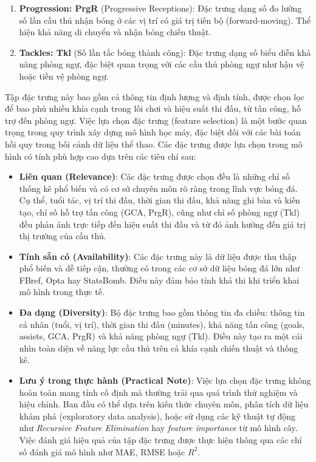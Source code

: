 \documentclass[12pt]{report}
\begin{document}
{\begin{enumerate}
    \item \textbf{Progression: PrgR} (Progressive Receptions): Đặc trưng dạng số đo lường số lần cầu thủ nhận bóng ở các vị trí có giá trị tiến bộ (forward-moving). Thể hiện khả năng di chuyển và nhận bóng chiến thuật.
    
    \item \textbf{Tackles: Tkl} (Số lần tắc bóng thành công): Đặc trưng dạng số biểu diễn khả năng phòng ngự, đặc biệt quan trọng với các cầu thủ phòng ngự như hậu vệ hoặc tiền vệ phòng ngự.
\end{enumerate}
Tập đặc trưng này bao gồm cả thông tin định lượng và định tính, được chọn lọc để bao phủ nhiều khía cạnh trong lối chơi và hiệu suất thi đấu, từ tấn công, hỗ trợ đến phòng ngự.
Việc lựa chọn đặc trưng (feature selection) là một bước quan trọng trong quy trình xây dựng mô hình học máy, đặc biệt đối với các bài toán hồi quy trong bối cảnh dữ liệu thể thao. Các đặc trưng được lựa chọn trong mô hình có tính phù hợp cao dựa trên các tiêu chí sau:

\begin{itemize}
    \item \textbf{Liên quan (Relevance)}: Các đặc trưng được chọn đều là những chỉ số thống kê phổ biến và có cơ sở chuyên môn rõ ràng trong lĩnh vực bóng đá. Cụ thể, tuổi tác, vị trí thi đấu, thời gian thi đấu, khả năng ghi bàn và kiến tạo, chỉ số hỗ trợ tấn công (GCA, PrgR), cũng như chỉ số phòng ngự (Tkl) đều phản ánh trực tiếp đến hiệu suất thi đấu và từ đó ảnh hưởng đến giá trị thị trường của cầu thủ.
    
    \item \textbf{Tính sẵn có (Availability)}: Các đặc trưng này là dữ liệu được thu thập phổ biến và dễ tiếp cận, thường có trong các cơ sở dữ liệu bóng đá lớn như FBref, Opta hay StatsBomb. Điều này đảm bảo tính khả thi khi triển khai mô hình trong thực tế.
    
    \item \textbf{Đa dạng (Diversity)}: Bộ đặc trưng bao gồm thông tin đa chiều: thông tin cá nhân (tuổi, vị trí), thời gian thi đấu (minutes), khả năng tấn công (goals, assists, GCA, PrgR) và khả năng phòng ngự (Tkl). Điều này tạo ra một cái nhìn toàn diện về năng lực cầu thủ trên cả khía cạnh chiến thuật và thống kê.
    
    \item \textbf{Lưu ý trong thực hành (Practical Note)}: Việc lựa chọn đặc trưng không hoàn toàn mang tính cố định mà thường trải qua quá trình thử nghiệm và hiệu chỉnh. Ban đầu có thể dựa trên kiến thức chuyên môn, phân tích dữ liệu khám phá (exploratory data analysis), hoặc sử dụng các kỹ thuật tự động như \textit{Recursive Feature Elimination} hay \textit{feature importance} từ mô hình cây. Việc đánh giá hiệu quả của tập đặc trưng được thực hiện thông qua các chỉ số đánh giá mô hình như MAE, RMSE hoặc $R^2$.
\end{itemize}
}
\end{document}
